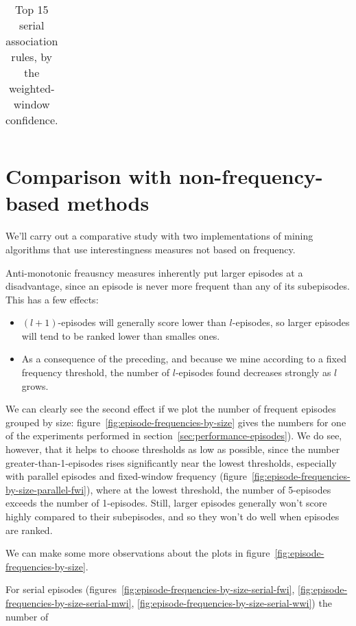 \begin{table}
\begin{tabulary}{\textwidth}{R|L}
\end{tabulary}

\caption{Top 15 serial association rules, by the weighted-window confidence.}
\end{table}



\section{Comparison with non-frequency-based methods}

We'll carry out a comparative study with two implementations of mining algorithms that use interestingness measures not based on frequency.

Anti-monotonic freausncy measures inherently put larger episodes at a disadvantage, since an episode is never more frequent than any of its subepisodes. This has a few effects:
\begin{itemize}
\item $ (l + 1) $-episodes will generally score lower than $ l $-episodes, so larger episodes will tend to be ranked lower than smalles ones.
\item As a consequence of the preceding, and because we mine according to a fixed frequency threshold, the number of $ l $-episodes found decreases strongly as $ l $ grows.
\end{itemize}
We can clearly see the second effect if we plot the number of frequent episodes grouped by size: figure~\ref{fig:episode-frequencies-by-size} gives the numbers for one of the experiments performed in section~\ref{sec:performance-episodes}). We do see, however, that it helps to choose thresholds as low as possible, since the number greater-than-1-episodes rises significantly near the lowest thresholds, especially with parallel episodes and fixed-window frequency (figure~\ref{fig:episode-frequencies-by-size-parallel-fwi}), where at the lowest threshold, the number of 5-episodes exceeds the number of 1-episodes. Still, larger episodes generally won't score highly compared to their subepisodes, and so they won't do well when episodes are ranked.


We can make some more observations about the plots in figure~\ref{fig:episode-frequencies-by-size}. %

For serial episodes (figures~\ref{fig:episode-frequencies-by-size-serial-fwi}, \ref{fig:episode-frequencies-by-size-serial-mwi}, \ref{fig:episode-frequencies-by-size-serial-wwi}) the number of %

